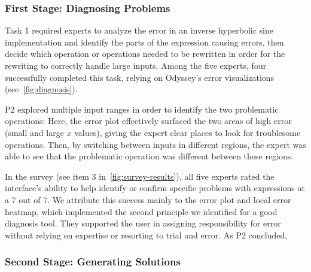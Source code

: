 \subsubsection*{First Stage: Diagnosing Problems}

Task 1 required experts to analyze the error in an inverse hyperbolic sine
implementation and identify the parts of the expression causing errors, then
decide which operation or operations needed to be rewritten in order for the
rewriting to correctly handle large inputs. Among the five experts, four
successfully completed this task, relying on Odyssey's error visualizations
(see~\autoref{fig:diagnosis}).

P2 explored multiple input ranges in order to identify 
  the two problematic operations: 
   Here, the error plot effectively surfaced the two areas of high
error (small and large $x$ values), giving the expert clear places to look for
troublesome operations. Then, by switching between inputs in different regions,
the expert was able to see that the problematic operation was different
between these regions.

In the survey (see item 3 in~\autoref{fig:survey-results}),
  all five experts rated the interface's ability
  to help identify or confirm specific problems with expressions 
  at a 7 out of 7.
We attribute this success mainly to the error plot and local error heatmap,
  which implemented the second principle we identified for a good diagnosis tool.
  They supported the user in assigning responsibility for error
  without relying on expertise or resorting to trial and error.
As P2 concluded, 

\subsubsection*{Second Stage: Generating Solutions}

